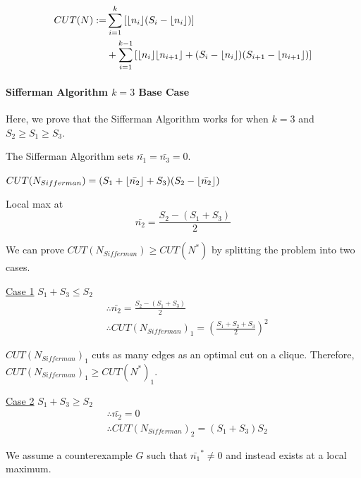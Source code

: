 \documentclass[12pt]{article}
\DeclarePairedDelimiter{\floor}{\lfloor}{\rfloor}
\begin{document}
\begin{align}
    CUT(N) :=   & \sum_{i=1}^{k} \left[ \floor{n_i} (S_i - \floor{n_i}) \right] \nonumber \\
                & + \sum_{i=1}^{k-1} \left[ \floor{n_i}\floor{n_{i+1}} + (S_i - \floor{n_i})(S_{i+1} - \floor{n_{i+1}}) \right] \nonumber
\end{align}



\paragraph{Sifferman Algorithm $k=3$ Base Case}
Here, we prove that the Sifferman Algorithm works for when $k=3$ and $S_2 \geq S_1 \geq S_3$.

The Sifferman Algorithm sets $\bar{n_1}=\bar{n_3}=0$.

$CUT(N_{Sifferman}) = (S_1 + \floor{\bar{n_2}} + S_3)( S_2 - \floor{\bar{n_2}})$

Local max at
$$\bar{n_2} = \frac{ S_2 - ( S_1 + S_3) }{2}$$

We can prove $CUT(N_{Sifferman}) \geq CUT(N^*)$ by splitting the problem into two cases.


\underline{Case 1} $S_1 + S_3 \leq S_2$
\begin{align}
    &\therefore \bar{n_2} = \frac{ S_2 - ( S_1 + S_3) }{2} \nonumber \\
    &\therefore CUT(N_{Sifferman})_1 = \left( \frac{S_1 + S_2 + S_3}{2} \right)^2 \nonumber
\end{align}

$CUT(N_{Sifferman})_1$ cuts as many edges as an optimal cut on a clique. Therefore, $CUT(N_{Sifferman})_1 \geq CUT(N^*)_1$.

\underline{Case 2} $S_1 + S_3 \geq S_2$
\begin{align}
    &\therefore \bar{n_2} = 0 \nonumber \\
    &\therefore CUT(N_{Sifferman})_2 = (S_1 + S_3)S_2 \nonumber
\end{align}

We assume a counterexample $G$ such that $\bar{n_1}^* \neq 0$ and instead exists at a local maximum.
\end{document}
